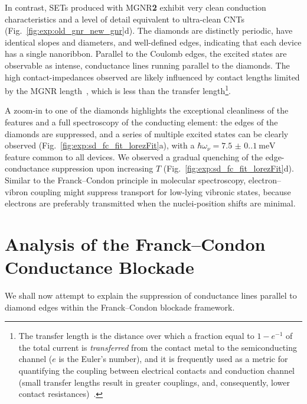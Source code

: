 In contrast, \glspl{SET} produced with \gls{MGNR}\textbf{2} exhibit very clean conduction characteristics and a level of detail equivalent to ultra-clean CNTs (Fig.~\ref{fig:exp:old_gnr_new_gnr}d). The diamonds are distinctly periodic, have identical slopes and diameters, and well-defined edges, indicating that each device has a single nanoribbon. Parallel to the Coulomb edges, the excited states are observable as intense, conductance lines running parallel to the diamonds. The high contact-impedances observed are likely influenced by contact lengths limited by the MGNR length~\cite{grosse2011nanoscale}, which is less than the transfer length\footnote[2]{The transfer length is the distance over which a fraction equal to $1-e^{-1}$ of the total current is \textit{transferred} from the contact metal to the semiconducting channel ($e$ is the Euler's number), and it is frequently used as a metric for quantifying the coupling between electrical contacts and conduction channel (small transfer lengths result in greater couplings, and, consequently, lower contact resistances)~\cite{saraswat2021materials}.}.

A zoom-in to one of the diamonds highlights the exceptional cleanliness of the features and a full spectroscopy of the conducting element: the edges of the diamonds are suppressed, and a series of multiple excited states can be clearly observed (Fig.~\ref{fig:exp:sd_fc_fit_lorezFit}a), with a $\hbar\omega_\nu=\SI[separate-uncertainty = true]{7.5(0.1)}{\milli\electronvolt}$ feature common to all devices. We observed a gradual quenching of the edge-conductance suppression upon increasing $T$ (Fig.~\ref{fig:exp:sd_fc_fit_lorezFit}d). Similar to the Franck--Condon principle in molecular spectroscopy, electron--vibron coupling might suppress transport for low-lying vibronic states, because electrons are preferably transmitted when the nuclei-position shifts are minimal.

\section{Analysis of the Franck--Condon Conductance Blockade}\label{solubility:sec:fc}

We shall now attempt to explain the suppression of conductance lines parallel to diamond edges within the Franck--Condon blockade framework.


